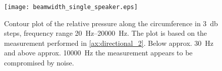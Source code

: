 \begin{figure}[H]
	\centering
	\texttt{[image: beamwidth\_single\_speaker.eps]}
	\caption{Contour plot of the relative pressure along the circumference in \SI{3}{\decibel} steps, frequency range \SIrange{20}{20000}{\hertz}. The plot is based on the measurement performed in \autoref{ax:directional_2}. Below approx. \SI{30}{\hertz} and above approx. \SI{10000}{\hertz} the measurement appears to be compromised by noise.}
		\label{fig:beamwidth_offset_4.5_cm}
\end{figure}